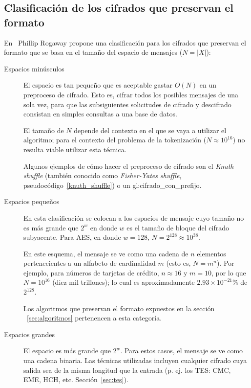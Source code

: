 \subsection{Clasificación de los cifrados que preservan el formato}

En~\cite{sinopsis_rogaway} Phillip Rogaway propone una clasificación para los
cifrados que preservan el formato que se basa en el tamaño del espacio de
mensajes ($ N = |X| $):

\begin{description}

  \item[Espacios minúsculos]

    El espacio es tan pequeño que es aceptable gastar $ O(N) $ en un preproceso
    de cifrado. Esto es, cifrar todos los posibles mensajes de una sola vez,
    para que las subsiguientes solicitudes de cifrado y descifrado consistan en
    simples consultas a una base de datos.

    El tamaño de $ N $ depende del contexto en el que se vaya a utilizar el
    algoritmo; para el contexto del problema de la tokenización
    ($ N \approx 10^{16} $) no resulta viable utilizar esta técnica.

    Algunos ejemplos de cómo hacer el preproceso de cifrado son el
    \textit{Knuth shuffle} (también conocido como \textit{Fisher-Yates shuffle},
    pseudocódigo~\ref{knuth_shuffle}) o un \gls{gl:cifrado_con_prefijo}.

  \item[Espacios pequeños]

    En esta clasificación se colocan a los espacios de mensaje cuyo tamaño
    no es más grande que $ 2^w $ en donde $ w $ es el tamaño de bloque del
    cifrado subyacente. Para AES, en donde $ w = 128 $, $ N = 2^{128}
    \approx 10^{38} $.

    En este esquema, el mensaje se ve como una cadena de $ n $ elementos
    pertenecientes a un alfabeto de cardinalidad $ m $ (esto es, $ N = m^n $).
    Por ejemplo, para números de tarjetas de crédito, $ n \approx 16 $ y
    $ m = 10 $, por lo que $ N = 10^{16} $ (diez mil trillones); lo cual es
    aproximadamente $ 2.93 \times 10^{-21} \% $ de $ 2^{128} $.

    Los algoritmos que preservan el formato expuestos en la sección
   ~\ref{sec:algoritmos} pertenencen a esta categoría.

  \item[Espacios grandes]

    El espacio es más grande que $ 2^w $. Para estos casos, el mensaje se ve
    como una cadena binaria. Las técnicas utilizadas incluyen cualquier cifrado
    cuya salida sea de la misma longitud que la entrada (p. ej. los
    TES: CMC, EME, HCH, etc. Sección~\ref{sec:tes}).

\end{description}

